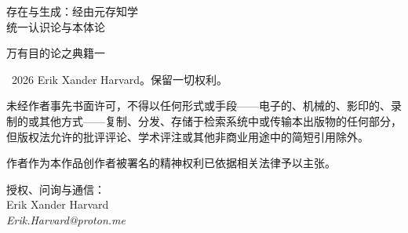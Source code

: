 \documentclass[10pt, openany, oneside]{book}
\renewcommand{\small}{\fontsize{9}{11.5}\selectfont}
\begin{document}

\thispagestyle{empty}
\vspace*{\fill}

\begin{center}

{\scshape 存在与生成：经由元存知学\\统一认识论与本体论}

\vspace{1em}

{\small 万有目的论之典籍一}

\end{center}

\vspace{1.5em}

{\small
\noindent \textcopyright\ 2026 Erik Xander Harvard。保留一切权利。

\vspace{0.8em}

\noindent 未经作者事先书面许可，不得以任何形式或手段——电子的、机械的、影印的、录制的或其他方式——复制、分发、存储于检索系统中或传输本出版物的任何部分，但版权法允许的批评评论、学术评注或其他非商业用途中的简短引用除外。

\vspace{0.8em}

\noindent 作者作为本作品创作者被署名的精神权利已依据相关法律予以主张。

\vspace{0.8em}

\noindent 授权、问询与通信：\\
Erik Xander Harvard\\
\textit{Erik.Harvard@proton.me}
}

\vspace{1.5em}
\end{document}

